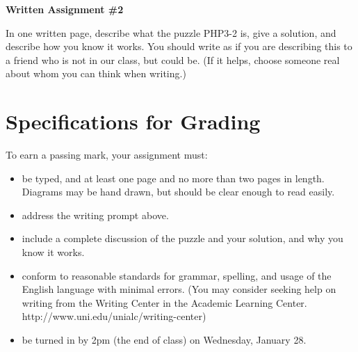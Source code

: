 \documentclass[12pt,letterpaper]{article}
\begin{document}
\setlength{\parskip}{1ex plus 0.5ex minus 0.2ex}
\setlength{\parindent}{0pt}

\pagestyle{fancy}
\lfoot{} 
\rfoot{} 

\begin{center}
{
\Large
\textbf{Written Assignment \#2}
}
\end{center}

In one written page, describe what the puzzle PHP3-2 is, give a solution, and describe how you know it works.
You should write as if you are describing this to a friend who is not in our class, but could be. 
(If it helps, choose someone real about whom you can think when writing.)

\section*{Specifications for Grading}

To earn a passing mark, your assignment must:
\begin{itemize}
\item be typed, and at least one page and no more than two pages in length. Diagrams
may be hand drawn, but should be clear enough to read easily.
\item address the writing prompt above.
\item include a complete discussion of the puzzle and your solution, and why you know it works.
\item conform to reasonable standards for grammar, spelling, and usage of the English language with minimal errors. (You may consider seeking help on writing from the Writing Center in the Academic Learning Center. http://www.uni.edu/unialc/writing-center)
\item be turned in by 2pm (the end of class) on Wednesday, January 28.
\end{itemize}



\clearpage
\end{document}
